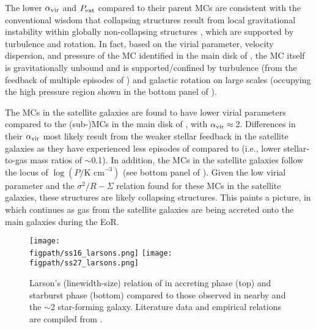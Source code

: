\documentclass[iop]{emulateapj}
\begin{document}
The lower $\alpha_{\rm vir}$ and $P_{\rm ext}$ compared to their parent MCs are consistent with
the conventional wisdom that collapsing structures result from local gravitational
instability within globally non-collapsing structures \citep[see e.g.,][]{Ballesteros-Paredes11a},
which are supported by turbulence and rotation. 
In fact, based on the virial parameter, velocity dispersion, and pressure of the MC identified in the main disk of \flower, 
the MC itself is gravitationally unbound and is supported/confined 
by turbulence (from the feedback of multiple episodes of \SF) 
and galactic rotation on large scales (occupying the high pressure region shown in the bottom panel of ).

The MCs in the satellite galaxies are found to have
lower virial parameters compared to the (sub-)MCs in the main disk of \flower,
with $\alpha_{\rm vir}\approx$\,2.
Differences in their $\alpha_{\rm vir}$ most likely result from the weaker
stellar feedback in the satellite galaxies as they have experienced less episodes of \SF compared to
\flower (i.e., lower stellar-to-gas mass ratios of $\sim$0.1). 
In addition, the MCs in the satellite galaxies follow the locus of 
$\log{(P/\textrm{K cm}^{-3})}$ (see bottom panel of ). 
Given the low virial parameter and the $\sigma^2/R - \Sigma$ relation found for these MCs in the satellite galaxies, 
these structures are likely collapsing structures.
This paints a picture, in which \SF continues as gas from the satellite galaxies are being accreted onto the main galaxies during the EoR.

\begin{figure*}[htbp]
\centering
\texttt{[image: \\figpath/ss16\_larsons.png]}
\texttt{[image: \\figpath/ss27\_larsons.png]}
\caption{
Larson's (linewidth-size) relation of \flower in
accreting phase (top) and
starburst phase (bottom) compared to
those observed in nearby and the \z$\sim$2 star-forming galaxy.
Literature data and empirical relations are compiled from \citet{Larson81a, Heyer04a, Rosolowsky05a, Bolatto08a, Swinbank11a, Leroy15a}.
\label{fig:larsons_single}}
\end{figure*}
\end{document}
